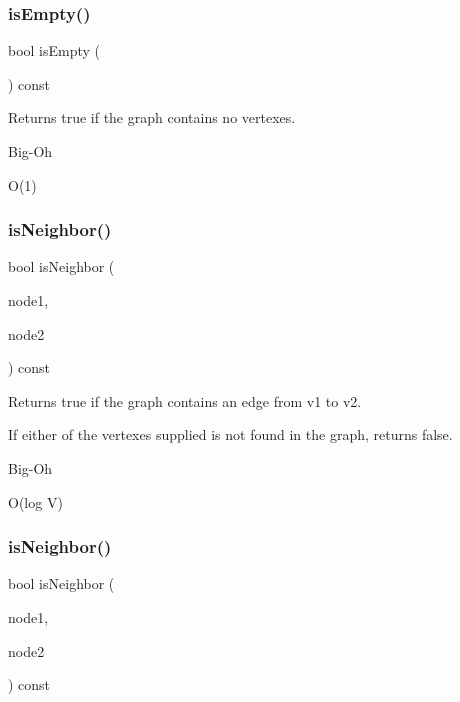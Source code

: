 \subsubsection{\texorpdfstring{is\+Empty()}{isEmpty()}}
{\footnotesize\ttfamily bool is\+Empty (\begin{DoxyParamCaption}{ }\end{DoxyParamCaption}) const}



Returns {\ttfamily true} if the graph contains no vertexes. 

\begin{DoxyRefDesc}{Big-\/\+Oh}
\item[\mbox{\hyperlink{BigOh__BigOh000082}{Big-\/\+Oh}}]O(1) \end{DoxyRefDesc}
\mbox{\label{classGraph_ab160bb64995133f6feb351cb23b031fb}} 
\subsubsection{\texorpdfstring{is\+Neighbor()}{isNeighbor()}\hspace{0.1cm}{\footnotesize\ttfamily [1/2]}}
{\footnotesize\ttfamily bool is\+Neighbor (\begin{DoxyParamCaption}\item[{const std\+::string \&}]{node1,  }\item[{const std\+::string \&}]{node2 }\end{DoxyParamCaption}) const}



Returns true if the graph contains an edge from v1 to v2. 

If either of the vertexes supplied is not found in the graph, returns false. \begin{DoxyRefDesc}{Big-\/\+Oh}
\item[\mbox{\hyperlink{BigOh__BigOh000080}{Big-\/\+Oh}}]O(log V) \end{DoxyRefDesc}
\mbox{\label{classGraph_a9e752628a118c4a06a538067c95bbb28}} 
\subsubsection{\texorpdfstring{is\+Neighbor()}{isNeighbor()}\hspace{0.1cm}{\footnotesize\ttfamily [2/2]}}
{\footnotesize\ttfamily bool is\+Neighbor (\begin{DoxyParamCaption}\item[{Node\+Type $\ast$}]{node1,  }\item[{Node\+Type $\ast$}]{node2 }\end{DoxyParamCaption}) const}



